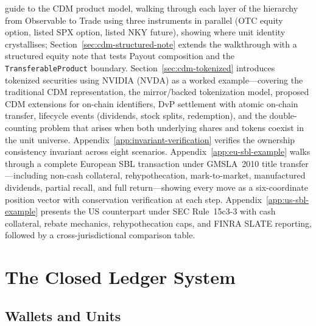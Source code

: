\documentclass[11pt,a4paper]{article}
\begin{document}
guide to the CDM product model, walking through each layer of the hierarchy from Observable to Trade using three instruments in parallel (OTC equity option, listed SPX option, listed NKY future), showing where unit identity crystallises; Section~\ref{sec:cdm-structured-note} extends the walkthrough with a structured equity note that tests Payout composition and the \texttt{TransferableProduct} boundary. Section~\ref{sec:cdm-tokenized} introduces tokenized securities using NVIDIA (NVDA) as a worked example---covering the traditional CDM representation, the mirror/backed tokenization model, proposed CDM extensions for on-chain identifiers, DvP settlement with atomic on-chain transfer, lifecycle events (dividends, stock splits, redemption), and the double-counting problem that arises when both underlying shares and tokens coexist in the unit universe. Appendix~\ref{app:invariant-verification} verifies the ownership consistency invariant across eight scenarios. Appendix~\ref{app:eu-sbl-example} walks through a complete European SBL transaction under GMSLA~2010 title transfer---including non-cash collateral, rehypothecation, mark-to-market, manufactured dividends, partial recall, and full return---showing every move as a six-coordinate position vector with conservation verification at each step. Appendix~\ref{app:us-sbl-example} presents the US counterpart under SEC Rule~15c3-3 with cash collateral, rebate mechanics, rehypothecation caps, and FINRA SLATE reporting, followed by a cross-jurisdictional comparison table.

\clearpage
\section{The Closed Ledger System}
\label{sec:ledger}

\subsection{Wallets and Units}
\end{document}
